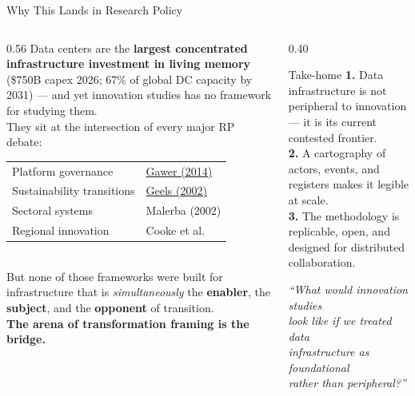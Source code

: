 \documentclass[aspectratio=169,11pt]{beamer}
\newcommand{\iconfull}[2]{\textcolor{#1}{\faIcon{#2}}}
\newcommand{\hl}[1]{\textcolor{dchighlight}{\textbf{#1}}}
\begin{document}
\begin{frame}{\iconfull{dcblue}{flag}\enspace Why This Lands in Research Policy}
\vspace{0.3em}
\begin{columns}[T]
\begin{column}{0.56\textwidth}
  \footnotesize
  Data centers are the \textbf{largest concentrated infrastructure investment in living memory} (\$750B capex 2026; 67\% of global DC capacity by 2031) — and yet innovation studies has no framework for studying them.\\[0.5em]
  They sit at the intersection of every major RP debate:\\[0.3em]
  \begin{tabular}{@{}ll@{}}
    Platform governance & \href{https://doi.org/10.1016/j.respol.2014.03.006}{Gawer (2014)} \\[0.1em]
    Sustainability transitions & \href{https://doi.org/10.1016/S0048-7333(02)00062-8}{Geels (2002)} \\[0.1em]
    Sectoral systems & Malerba (2002) \\[0.1em]
    Regional innovation & Cooke et al. \\
  \end{tabular}\\[0.5em]
  But none of those frameworks were built for infrastructure that is \textit{simultaneously} the \textbf{enabler}, the \textbf{subject}, and the \textbf{opponent} of transition.\\[0.4em]
  \hl{The arena of transformation framing is the bridge.}
\end{column}
\begin{column}{0.40\textwidth}
  \vspace{0.2em}
  \begin{block}{Take-home}
    \footnotesize
    \textbf{1.} Data infrastructure is not peripheral to innovation — it is its current contested frontier.\\[0.3em]
    \textbf{2.} A cartography of actors, events, and registers makes it legible at scale.\\[0.3em]
    \textbf{3.} The methodology is replicable, open, and designed for distributed collaboration.
  \end{block}
  \vspace{0.5em}
  \begin{center}
    \small\textit{``What would innovation studies\\
    look like if we treated data\\
    infrastructure as \alert{foundational}\\
    rather than peripheral?''}
  \end{center}
\end{column}
\end{columns}
\end{frame}
\end{document}
